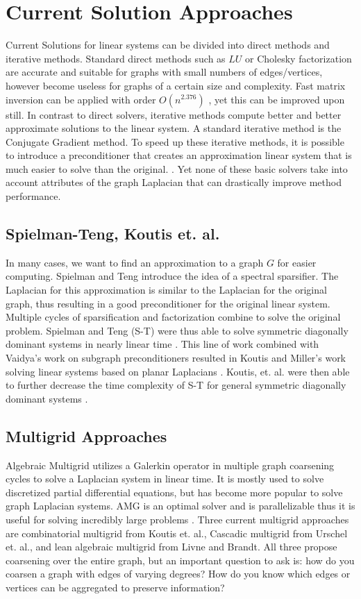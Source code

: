 \documentclass{article}
\begin{document}
\section{Current Solution Approaches}
Current Solutions for linear systems can be divided into direct methods and iterative methods. Standard direct methods such as $LU$ or Cholesky factorization are accurate and suitable for graphs with small numbers of edges/vertices, however become useless for graphs of a certain size and complexity. Fast matrix inversion can be applied with order $O(n^{2.376})$ \cite{Spielman:2010}, yet this can be improved upon still. In contrast to direct solvers, iterative methods compute better and better approximate solutions to the linear system. A standard iterative method is the Conjugate Gradient method. To speed up these iterative methods, it is possible to introduce a preconditioner that creates an approximation linear system that is much easier to solve than the original. \cite{Spielman:2010}. Yet none of these basic solvers take into account attributes of the graph Laplacian that can drastically improve method performance.

\subsection{Spielman-Teng, Koutis et. al.}
In many cases, we want to find an approximation to a graph $G$ for easier computing. Spielman and Teng introduce the idea of a spectral sparsifier. The Laplacian for this approximation is similar to the Laplacian for the original graph, thus resulting in a good preconditioner for the original linear system. Multiple cycles of sparsification and factorization combine to solve the original problem. Spielman and Teng (S-T) were thus able to solve symmetric diagonally dominant systems in nearly linear time \cite{Spielman:2008}.  This line of work combined with Vaidya's work on subgraph preconditioners resulted in Koutis and Miller's work solving linear systems based on planar Laplacians \cite{Koutis:2007,Vaidya:1991}. Koutis, et. al. were then able to further decrease the time complexity of S-T for general symmetric diagonally dominant systems \cite{Koutis:2010}.

\subsection{Multigrid Approaches}
Algebraic Multigrid utilizes a Galerkin operator in multiple graph coarsening cycles to solve a Laplacian system in linear time. It is mostly used to solve discretized partial differential equations, but has become more popular to solve graph Laplacian systems. AMG is an optimal solver and is parallelizable thus it is useful for solving incredibly large problems \cite{Livne:2012}. Three current multigrid approaches are combinatorial multigrid from Koutis et. al., Cascadic multigrid from Urschel et. al., and lean algebraic multigrid from Livne and Brandt. All three propose coarsening over the entire graph, but an important question to ask is: how do you coarsen a graph with edges of varying degrees? How do you know which edges or vertices can be aggregated to preserve information?
\end{document}
